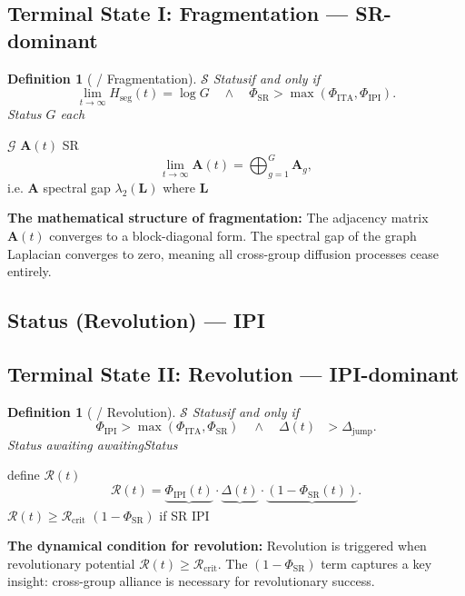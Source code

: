 \documentclass[11pt,a4paper]{article}
\newtheorem{definition}[theorem]{Definition}
\theoremstyle{remark}
\newcommand{\ineq}{\Delta}
\begin{document}
\subsection{Terminal State I: Fragmentation — SR-dominant}

\begin{definition}[ / Fragmentation]
\label{def:fragmentation}
 $\mathcal{S}$ \textbf{}Statusif and only if
\[
\lim_{t \to \infty} H_{\text{seg}}(t) = \log G \quad \land \quad 
\Phi_{\text{SR}} > \max(\Phi_{\text{ITA}}, \Phi_{\text{IPI}}).
\]
Status $G$ each


\end{definition}

\textbf{}
 $\mathcal{G}$  $\mathbf{A}(t)$ SR 
\[
\lim_{t \to \infty} \mathbf{A}(t) = \bigoplus_{g=1}^{G} \mathbf{A}_g,
\]
i.e. $\mathbf{A}$ spectral gap
$\lambda_2(\mathbf{L})$ where $\mathbf{L}$ 


\textbf{} 

\textbf{The mathematical structure of fragmentation:} The adjacency matrix $\mathbf{A}(t)$
converges to a block-diagonal form. The spectral gap of the graph Laplacian converges
to zero, meaning all cross-group diffusion processes cease entirely.

\subsection{Status (Revolution) — IPI }
\subsection{Terminal State II: Revolution — IPI-dominant}

\begin{definition}[ / Revolution]
\label{def:revolution}
 $\mathcal{S}$ \textbf{}Statusif and only if
\[
\Phi_{\text{IPI}} > \max(\Phi_{\text{ITA}}, \Phi_{\text{SR}}) \quad \land \quad
\ineq(t) \text{  } > \ineq_{\text{jump}}.
\]
Status
awaiting
\textbf{}awaitingStatus
\end{definition}

\textbf{}
define\textbf{} $\mathcal{R}(t)$
\[
\mathcal{R}(t) = \underbrace{\Phi_{\text{IPI}}(t)}_{\text{}} \cdot
                 \underbrace{\ineq(t)}_{\text{}} \cdot
                 \underbrace{(1 - \Phi_{\text{SR}}(t))}_{\text{}}.
\]
 $\mathcal{R}(t) \geq \mathcal{R}_{\text{crit}}$ 
$(1 - \Phi_{\text{SR}})$ 
\textbf{}if SR 
IPI 


\textbf{The dynamical condition for revolution:} Revolution is triggered when
revolutionary potential $\mathcal{R}(t) \geq \mathcal{R}_{\text{crit}}$.
The $(1 - \Phi_{\text{SR}})$ term captures a key insight: cross-group alliance is
necessary for revolutionary success.
\end{document}
